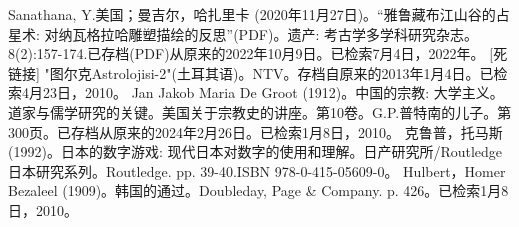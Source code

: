 \begin{enumerate}
 Sanathana, Y.美国；曼吉尔，哈扎里卡 (2020年11月27日)。“雅鲁藏布江山谷的占星术: 对纳瓦格拉哈雕塑描绘的反思”(PDF)。遗产: 考古学多学科研究杂志。8(2):157-174.已存档(PDF)从原来的2022年10月9日。已检索7月4日，2022年。 [死链接]
 "图尔克Astrolojisi-2"(土耳其语)。NTV。存档自原来的2013年1月4日。已检索4月23日，2010。
 Jan Jakob Maria De Groot (1912)。中国的宗教: 大学主义。道家与儒学研究的关键。美国关于宗教史的讲座。第10卷。G.P.普特南的儿子。第300页。已存档从原来的2024年2月26日。已检索1月8日，2010。
 克鲁普，托马斯 (1992)。日本的数字游戏: 现代日本对数字的使用和理解。日产研究所/Routledge日本研究系列。Routledge. pp. 39-40.ISBN 978-0-415-05609-0。
 Hulbert，Homer Bezaleel (1909)。韩国的通过。Doubleday, Page & Company. p. 426。已检索1月8日，2010。
\end{enumerate}
